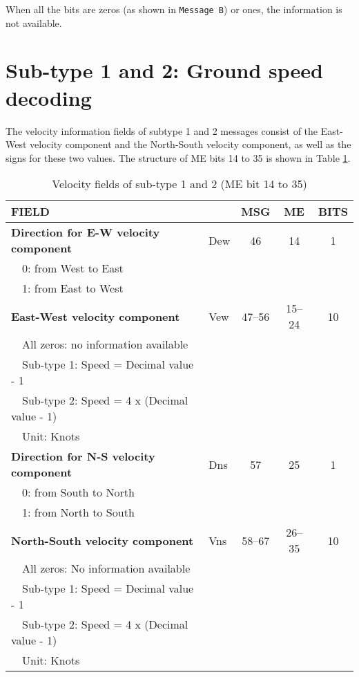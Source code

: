 When all the bits are zeros (as shown in \texttt{Message B}) or ones, the information is not available.


\section{Sub-type 1 and 2: Ground speed decoding}

The velocity information fields of subtype 1 and 2 messages consist of the East-West velocity component and the North-South velocity component, as well as the signs for these two values. The structure of ME bits 14 to 35 is shown in Table \ref{tb:adsb-velocity-bits-14-35-gs}.


\begin{table}[ht]
\caption{Velocity fields of sub-type 1 and 2 (ME bit 14 to 35)}
\label{tb:adsb-velocity-bits-14-35-gs}
\footnotesize
\begin{tabular}{|l|l|c|c|c|}
\hline
\textbf{FIELD} & & \textbf{MSG} & \textbf{ME} & \textbf{BITS} \\ \hline
\textbf{Direction for E-W velocity component} & Dew & 46 & 14 & 1\\
~~0: from West to East &&&&\\
~~1: from East to West &&&& \\ \hline
\textbf{East-West velocity component} & Vew & 47--56 & 15--24 & 10\\
~~All zeros: no information available &&&& \\
~~Sub-type 1: Speed = Decimal value - 1 &&&& \\
~~Sub-type 2: Speed = 4 x (Decimal value - 1) &&&& \\
~~Unit: Knots &&&& \\ \hline
\textbf{Direction for N-S velocity component} & Dns & 57 & 25 & 1 \\
~~0: from South to North &&&& \\
~~1: from North to South &&&& \\ \hline
\textbf{North-South velocity component} & Vns & 58--67 & 26--35 & 10\\
~~All zeros: No information available &&&&\\
~~Sub-type 1: Speed = Decimal value - 1 &&&&\\
~~Sub-type 2: Speed = 4 x (Decimal value - 1) &&&&\\
~~Unit: Knots &&&& \\ \hline
\end{tabular}
\end{table}

